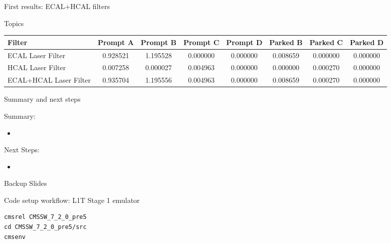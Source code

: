 \documentclass[8pt]{beamer}
\begin{document}
\begin{frame}{First results: ECAL+HCAL filters}


\begin{block}{Topics}
\centering

\begin{tabular}{|l||c|c|c|c||c|c|c|}
\hline
Filter & Prompt A & Prompt B & Prompt C & Prompt D & Parked B & Parked C & Parked D \\
\hline \hline
ECAL Laser Filter & 0.928521 & 1.195528 & 0.000000 & 0.000000 & 0.008659 & 0.000000 & 0.000000 \\
HCAL Laser Filter & 0.007258 & 0.000027 & 0.004963 & 0.000000 & 0.000000 & 0.000270 & 0.000000 \\
\hline
ECAL+HCAL Laser Filter & 0.935704 & 1.195556 & 0.004963 & 0.000000 & 0.008659 & 0.000270 & 0.000000 \\
\hline
\end{tabular}

\end{block}

\end{frame}

\begin{frame}{Summary and next steps}
 
\begin{block}{Summary:}
 
\begin{itemize}
  \item 
\end{itemize}

\end{block}

\begin{block}{Next Steps:}
 
\begin{itemize}
  \item 
\end{itemize}
 
\end{block}

\end{frame}


\appendix
\begin{frame}
 
\begin{block}

\begin{center}Backup Slides\end{center}

\end{block}

\end{frame}


\begin{frame}{Code setup workflow: L1T Stage 1 emulator}

\begin{block}

\begin{verbatim}
cmsrel CMSSW_7_2_0_pre5
cd CMSSW_7_2_0_pre5/src
cmsenv
\end{verbatim}

\end{block}

\end{frame}
\end{document}

